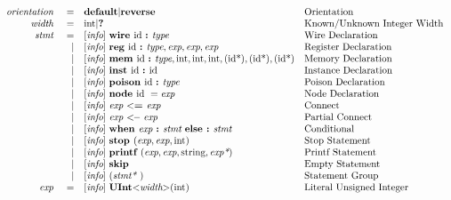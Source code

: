 \documentclass[12pt]{article}
\begin{document}
{\[\begin{array}{rrll}
\text{\em orientation\ }&=     &\text{\bf default} \vert \text{\bf reverse}                                             &\text{Orientation}\\
\text{\em width\ }      &=     &\text{int} \vert \text{\bf ?\ }                                                            &\text{Known/Unknown Integer Width}\\
\text{\em stmt\ }       &=     &[\text{\em info}]\  \text{\bf wire\ } \text{id } \text{\bf :\ } \text{\em type\ }                                          &\text{Wire Declaration}\\
                &\vert &[\text{\em info}]\  \text{\bf reg\ } \text{id } \text{\bf :\ }  \text{\em type} , \text{\em exp} , \text{\em exp} , \text{\em exp}     &\text{Register Declaration}\\
                &\vert &[\text{\em info}]\  \text{\bf mem\ } \text{id } \text{\bf :\ } \text{\em type}, 
                        \text{int},\text{int},\text{int},(\text{id*}),(\text{id*}),(\text{id*})                                     &\text{Memory Declaration}\\
                &\vert &[\text{\em info}]\  \text{\bf inst\ } \text{id } \text{\bf :\ } \text{id }                                                &\text{Instance Declaration}\\
                &\vert &[\text{\em info}]\  \text{\bf poison\ } \text{id } \text{\bf :\ } \text{\em type}                                       &\text{Poison Declaration}\\
                &\vert &[\text{\em info}]\  \text{\bf node\ } \text{id }  = \text{\em exp\ }                                               &\text{Node Declaration}\\
                &\vert &[\text{\em info}]\  \text{\em exp\ } \text{\bf $<$=\ } \text{\em exp\ }                                             &\text{Connect}\\
                &\vert &[\text{\em info}]\  \text{\em exp\ } \text{\bf $<$--\ } \text{\em exp\ }                                            &\text{Partial Connect}\\
                &\vert &[\text{\em info}]\  \text{\bf when\ } \text{\em exp\ } \text{\bf :\ } \text{\em stmt\ } \text{\bf else :\ } \text{\em stmt\ }               &\text{Conditional}\\
                &\vert &[\text{\em info}]\  \text{\bf stop\ }(\text{\em exp},\text{\em exp},\text{int})                                    &\text{Stop Statement}\\
                &\vert &[\text{\em info}]\  \text{\bf printf\ }(\text{\em exp},\text{\em exp},\text{string},\text{\em exp*})                    &\text{Printf Statement}\\
                &\vert &[\text{\em info}]\  \text{\bf skip\ }                                                               &\text{Empty Statement}\\
                &\vert &[\text{\em info}]\  (\text{\em stmt*\ })                                                            &\text{Statement Group}\\
\text{\em exp\ }        &=     &[\text{\em info}]\  \text{\bf UInt} \text{\bf $<$} \text{\em width} \text{\bf $>$}(\text{int})                       &\text{Literal Unsigned Integer}\\

\end{array}\]}
\end{document}
